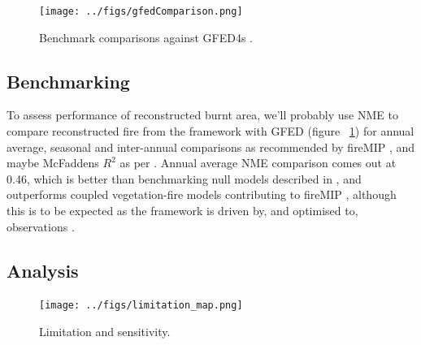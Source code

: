 \begin{figure}[!ht]
\begin{shaded}
  \centering
    \texttt{[image: ../figs/gfedComparison.png]}
  \caption{Benchmark comparisons against GFED4s \citep{Giglio2013}.}
  \label{fig:benchmark}
\end{shaded}
\end{figure}

\subsection{Benchmarking}
\begin{shaded}
To assess performance of reconstructed burnt area, we'll probably use NME to compare reconstructed fire from the framework with GFED (figure ~\ref{fig:benchmark}) for annual average, seasonal and inter-annual comparisons \citep{kelley2013comprehensive} as recommended by fireMIP \citet{gmd-2016-237, hantson2016status}, and maybe McFaddens $R^{2}$ as per \citep{bistinas2014causal}. Annual average NME comparison comes out at 0.46, which is better than benchmarking null models described in \citet{kelley2013comprehensive}, and outperforms coupled vegetation-fire models contributing to fireMIP \citep{hantson2016status}, although this is to be expected as the framework is driven by, and optimised to, observations \citep{kelley2013comprehensive}.

\end{shaded}


\subsection{Analysis}

\begin{figure}[!ht]
\begin{shaded}
  \centering
    \texttt{[image: ../figs/limitation\_map.png]}

  \caption{Limitation and sensitivity.}
  \label{fig:lim_sen_maps}
\end{shaded}
\end{figure}

